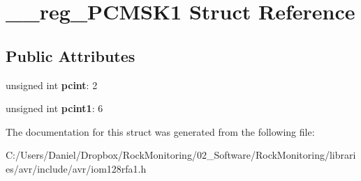 \hypertarget{struct____reg___p_c_m_s_k1}{}\section{\+\_\+\+\_\+reg\+\_\+\+P\+C\+M\+S\+K1 Struct Reference}
\label{struct____reg___p_c_m_s_k1}
\subsection*{Public Attributes}
\begin{DoxyCompactItemize}
\item 
unsigned int {\bfseries pcint}\+: 2\hypertarget{struct____reg___p_c_m_s_k1_a5d11f01c4d85e77f6b9eddd1bccab469}{}\label{struct____reg___p_c_m_s_k1_a5d11f01c4d85e77f6b9eddd1bccab469}

\item 
unsigned int {\bfseries pcint1}\+: 6\hypertarget{struct____reg___p_c_m_s_k1_aac71507cbffd8a0f51fb15d92fbab4b6}{}\label{struct____reg___p_c_m_s_k1_aac71507cbffd8a0f51fb15d92fbab4b6}

\end{DoxyCompactItemize}


The documentation for this struct was generated from the following file\+:\begin{DoxyCompactItemize}
\item 
C\+:/\+Users/\+Daniel/\+Dropbox/\+Rock\+Monitoring/02\+\_\+\+Software/\+Rock\+Monitoring/libraries/avr/include/avr/iom128rfa1.\+h\end{DoxyCompactItemize}
